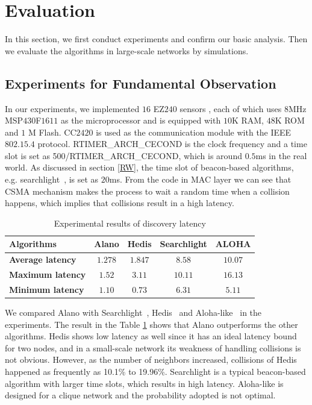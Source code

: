 \section{Evaluation}
\label{Evaluation}

In this section, we first conduct experiments and confirm our basic analysis.
Then we evaluate the algorithms in large-scale networks by simulations.

\subsection{Experiments for Fundamental Observation}

In our experiments, we implemented $16$ EZ$240$ sensors \cite{huang2012easipled}, each of which uses $8$MHz MSP$430$F$1611$ 
as the microprocessor and is equipped with $10$K RAM, 
$48$K ROM and $1$ M Flash. CC$2420$ is used as the communication 
module with the IEEE $802.15.4$ protocol. RTIMER\_ARCH\_CECOND is the clock frequency 
and a time slot is set as 500/RTIMER\_ARCH\_CECOND,
which is around $0.5$ms in the real world. As discussed in section \ref{RW}, the time slot of beacon-based 
algorithms, e.g. searchlight~\cite{bakht2012searchlight}, is set as $20$ms.
From the code in MAC layer we can see  that CSMA mechanism makes the process to wait a random time 
when a collision happens, which implies that collisions result in a high latency.    

\begin{table}[htbp]
\caption{Experimental results of discovery latency}
\centering
\begin{tabular}{|l|c|c|c|c|} 
\hline
\textbf{Algorithms} & \textbf{Alano} & \textbf{Hedis} & \textbf{Searchlight} & \textbf{ALOHA} \\
\hline
\textbf{Average latency} & \textbf{$1.278$} & \textbf{$1.847$} & \textbf{$8.58$} & \textbf{$10.07$} \\
\hline
\textbf{Maximum latency} & \textbf{$1.52$} & \textbf{$3.11$} & \textbf{$10.11$} & \textbf{$16.13$} \\
\hline
\textbf{Minimum latency} & \textbf{$1.10$} & \textbf{$0.73$} & \textbf{$6.31$} & \textbf{$5.11$} \\
\hline
\end{tabular}
\label{Exp}
\end{table}

We compared Alano with Searchlight~\cite{bakht2012searchlight}, Hedis~\cite{chen2015heterogeneous}
and Aloha-like~\cite{you2011aloha} in the experiments. The result in the Table \ref{Exp} shows that Alano outperforms the other algorithms.
Hedis shows low latency as well since it has an ideal latency bound for two nodes, 
and in a small-scale network its weakness of handling collisions is not obvious. 
However, as the number of neighbors increased, collisions of Hedis \cite{chen2015heterogeneous} happened as frequently as 10.1\% to 19.96\%.
Searchlight is a typical beacon-based algorithm with larger time slots, which results in high latency.
Aloha-like is designed for a clique network and the probability adopted is not optimal.


